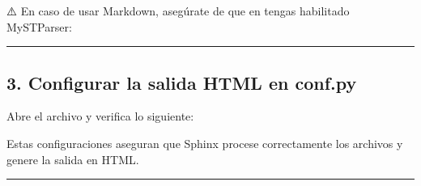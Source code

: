 \documentclass[a4paper,10pt,oneside,spanish,openany]{sphinxmanual}
\begin{document}
\sphinxAtStartPar
⚠️  En caso de usar Markdown, asegúrate de que en  tengas habilitado MyST\sphinxhyphen{}Parser:

\begin{sphinxVerbatim}[commandchars=\\\{\}]
  \PYG{p}{[}
\PYG{p}{]}
\end{sphinxVerbatim}


\bigskip\hrule\bigskip



\subsection{3. Configurar la salida HTML en conf.py}
\label{\detokenize{configuracion_inicial/008.Generar_HTML:configurar-la-salida-html-en-conf-py}}
\sphinxAtStartPar
Abre el archivo  y verifica lo siguiente:

\begin{sphinxVerbatim}[commandchars=\\\{\}]
  

  \PYG{p}{[}\PYG{p}{]}

  
     
     
\end{sphinxVerbatim}

\sphinxAtStartPar
Estas configuraciones aseguran que Sphinx procese correctamente los archivos  y genere la salida en HTML.


\bigskip\hrule\bigskip
\end{document}
